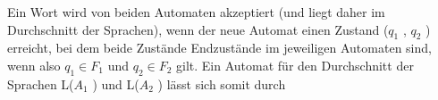 \documentclass{lehramt-informatik-haupt}
\begin{document}
Ein Wort wird von beiden Automaten
akzeptiert (und liegt daher im Durchschnitt der Sprachen), wenn der neue
Automat einen Zustand ($q_1$ , $q_2$ ) erreicht, bei dem beide Zustände
Endzustände im jeweiligen Automaten sind, wenn also $q_1 \in F_1$ und
$q_2 \in F_2$ gilt. Ein Automat für den Durchschnitt der Sprachen
L($A_1$ ) und L($A_2$ ) lässt sich somit durch

\literatur
\end{document}
